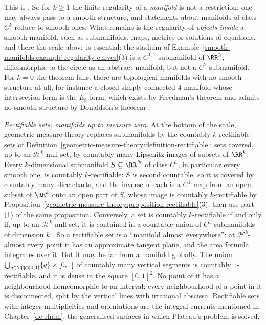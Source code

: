 This is \cite[Chapter 2, Section 2]{hirsch-differential-topology}. So for $k \geq 1$ the finite regularity of a \emph{manifold} is not a restriction: one may always pass to a smooth structure, and statements about
manifolds of class $C^k$ reduce to smooth ones. What remains is the regularity of \emph{objects inside} a smooth manifold, such as submanifolds, maps, metrics or solutions of equations, and there the scale above is
essential: the stadium of Example~\ref{smooth-manifolds:example-regularity-curves}(3) is a $C^{1,1}$ submanifold of $\RR^2$, diffeomorphic to the circle as an abstract manifold, but not a $C^2$ submanifold. For
$k = 0$ the theorem fails: there are topological manifolds with no smooth structure at all, for instance a closed simply connected $4$-manifold whose intersection form is the $E_8$ form, which exists by Freedman's
theorem \cite{freedman-1982} and admits no smooth structure by Donaldson's theorem \cite{donaldson-1983}.

\begin{remark}\label{smooth-manifolds:remark-rectifiable}
\emph{Rectifiable sets: manifolds up to measure zero.} At the bottom of the scale, geometric measure theory replaces submanifolds by the countably $k$-rectifiable sets of
Definition~\ref{geometric-measure-theory:definition-rectifiable}: sets covered, up to an $\mathcal{H}^k$-null set, by countably many Lipschitz images of subsets of $\RR^k$. Every $k$-dimensional submanifold $S \subseteq \RR^N$ of
class $C^1$, in particular every smooth one, is countably $k$-rectifiable: $S$ is second countable, so it is covered by countably many slice charts, and the inverse of each is a $C^1$ map from an open subset of $\RR^k$
onto an open part of $S$, whose image is countably $k$-rectifiable by Proposition~\ref{geometric-measure-theory:proposition-rectifiable}(3); then use part (1) of the same proposition. Conversely, a set is countably
$k$-rectifiable if and only if, up to an $\mathcal{H}^k$-null set, it is contained in a countable union of $C^1$ submanifolds of dimension $k$ \cite[3.2.29]{federer-gmt}. So a rectifiable set is a ``manifold
almost everywhere'': at $\mathcal{H}^k$-almost every point it has an approximate tangent plane, and the area formula integrates over it. But it may be far from a manifold globally. The union
$\bigcup_{q \in \QQ \cap [0, 1]}\{q\} \times [0, 1]$ of countably many vertical segments is countably $1$-rectifiable, and it is dense in the square $[0, 1]^2$. No point of it has a neighbourhood homeomorphic to an
interval: every neighbourhood of a point in it is disconnected, split by the vertical lines with irrational abscissa. Rectifiable sets with integer multiplicities and orientations are the integral currents mentioned in Chapter~\ref{de-rham}, the generalised surfaces in which Plateau's problem
is solved.
\end{remark}

